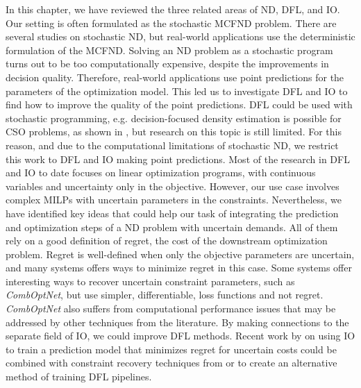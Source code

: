 In this chapter, we have reviewed the three related areas of ND, DFL, and IO. Our setting is often formulated as the stochastic MCFND problem. There are several studies on stochastic ND, but real-world applications use the deterministic formulation of the MCFND. Solving an ND problem as a stochastic program turns out to be too computationally expensive, despite the improvements in decision quality. Therefore, real-world applications use point predictions for the parameters of the optimization model. This led us to investigate DFL and IO to find how to improve the quality of the point predictions. DFL could be used with stochastic programming, e.g. decision-focused density estimation is possible for CSO problems, as shown in \cite{sadanaSurveyContextualOptimization2023}, but research on this topic is still limited. For this reason, and due to the computational limitations of stochastic ND, we restrict this work to DFL and IO making point predictions. 
Most of the research in DFL and IO to date focuses on linear optimization programs, with continuous variables and uncertainty only in the objective. However, our use case involves complex MILPs with uncertain parameters in the constraints. Nevertheless, we have identified key ideas that could help our task of integrating the prediction and optimization steps of a ND problem with uncertain demands. All of them rely on a good definition of regret, the cost of the downstream optimization problem. Regret is well-defined when only the objective parameters are uncertain, and many systems offers ways to minimize regret in this case. Some systems offer interesting ways to recover uncertain constraint parameters, such as \textit{CombOptNet}, but use simpler, differentiable, loss functions and not regret. \textit{CombOptNet} also suffers from computational performance issues that may be addressed by other techniques from the literature. By making connections to the separate field of IO, we could improve DFL methods. Recent work by \cite{sunMaximumOptimalityMargin2023} on using IO to train a prediction model that minimizes regret for uncertain costs could be combined with constraint recovery techniques from \cite{chanInverseOptimizationRecovery2020} or \cite{ghobadiInferringLinearFeasible2021} to create an alternative method of training DFL pipelines.
